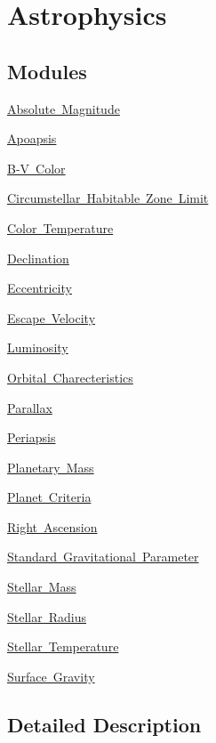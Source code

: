 \hypertarget{group___e_g_x_phys-_astrophysics}{}\section{Astrophysics}
\label{group___e_g_x_phys-_astrophysics}
\subsection*{Modules}
\begin{DoxyCompactItemize}
\item 
\mbox{\hyperlink{group___e_g_x_phys-_astrophysics-_absolute_magnitude}{Absolute Magnitude}}
\item 
\mbox{\hyperlink{group___e_g_x_phys-_apoapsis}{Apoapsis}}
\item 
\mbox{\hyperlink{group___e_g_x_phys-_b-_v_color}{B-\/\+V Color}}
\item 
\mbox{\hyperlink{group___e_g_x_phys-_circumstellar_habitable_zone_limit}{Circumstellar Habitable Zone Limit}}
\item 
\mbox{\hyperlink{group___e_g_x_phys-_astrophysics-_color_temperature}{Color Temperature}}
\item 
\mbox{\hyperlink{group___e_g_x_phys-_astrophysics-_declination}{Declination}}
\item 
\mbox{\hyperlink{group___e_g_x_phys-_eccentricity}{Eccentricity}}
\item 
\mbox{\hyperlink{group___e_g_x_phys-_astrophysics-_escape_velocity}{Escape Velocity}}
\item 
\mbox{\hyperlink{group___e_g_x_phys-_luminosity}{Luminosity}}
\item 
\mbox{\hyperlink{group___e_g_x_phys-_orbital_charecteristics}{Orbital Charecteristics}}
\item 
\mbox{\hyperlink{group___e_g_x_phys-_astrophysic-_parallax}{Parallax}}
\item 
\mbox{\hyperlink{group___e_g_x_phys-_periapsis}{Periapsis}}
\item 
\mbox{\hyperlink{group___e_g_x_phys-_planetary_mass}{Planetary Mass}}
\item 
\mbox{\hyperlink{group___e_g_x_phys-_planet_criteria}{Planet Criteria}}
\item 
\mbox{\hyperlink{group___e_g_x_phys-_astrophysics-_right_ascension}{Right Ascension}}
\item 
\mbox{\hyperlink{group___e_g_x_phys-_astrophysics-_standard_gravitational_parameter}{Standard Gravitational Parameter}}
\item 
\mbox{\hyperlink{group___e_g_x_phys-_stellar_mass}{Stellar Mass}}
\item 
\mbox{\hyperlink{group___e_g_x_phys-_stellar_radius}{Stellar Radius}}
\item 
\mbox{\hyperlink{group___e_g_x_phys-_stellar_temperature}{Stellar Temperature}}
\item 
\mbox{\hyperlink{group___e_g_x_phys-_astrophysics-_surface_gravity}{Surface Gravity}}
\end{DoxyCompactItemize}


\subsection{Detailed Description}
